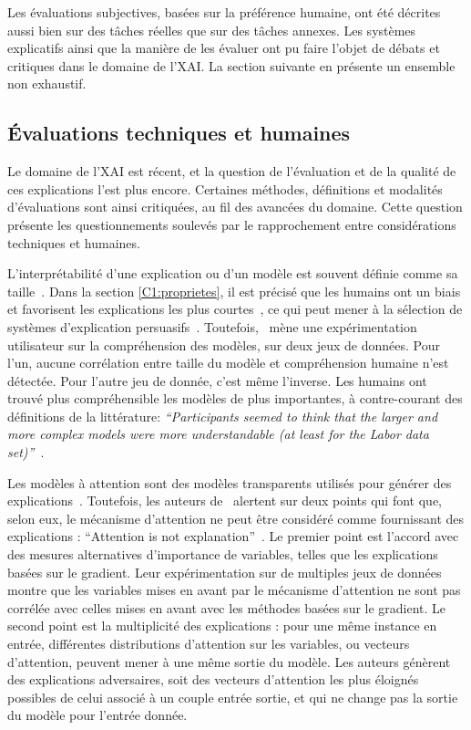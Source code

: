 Les évaluations subjectives, basées sur la préférence humaine, ont été décrites aussi bien sur des tâches réelles que sur des tâches annexes. Les systèmes explicatifs ainsi que la manière de les évaluer ont pu faire l'objet de débats et critiques dans le domaine de l'XAI. La section suivante en présente un ensemble non exhaustif.

\subsection{\'Evaluations techniques et humaines} \label{C1:debat}
Le domaine de l'XAI est récent, et la question de l'évaluation et de la qualité de ces explications l'est plus encore.
Certaines méthodes, définitions et modalités d'évaluations sont ainsi critiquées, au fil des avancées du domaine. Cette question présente les questionnements soulevés par le rapprochement entre considérations techniques et humaines.

L'interprétabilité d'une explication ou d'un modèle est souvent définie comme sa taille~\cite{Ribeiro2016,Petsiuk2018, Poppi2021,Lakkaraju2019,Zafar2021a,Virgolin2021}.
Dans la section \ref{C1:proprietes}, il est précisé que les humains ont un biais et favorisent les explications les plus courtes~\cite{Miller2017}, ce qui peut mener à la sélection de systèmes d'explication persuasifs~\cite{Gilpin2018}.
Toutefois,~\cite{Allahyari2011} mène une expérimentation utilisateur sur la compréhension des modèles, sur deux jeux de données. Pour l'un, aucune corrélation entre taille du modèle et compréhension humaine n'est détectée. Pour l'autre jeu de donnée, c'est même l'inverse. Les humains ont trouvé plus compréhensible les modèles de plus importantes, à contre-courant des définitions de la littérature: \textit{``Participants seemed to think that the larger and more complex models were more understandable (at least for the Labor data set)''}~\cite{Allahyari2011}.

Les modèles à attention sont des modèles transparents utilisés pour générer des explications~\cite{Lin2017,Wang2016,Yang2018,Bao2018,Gomez2022b,Ghaeini2018,SantanaCorreia2022}.
Toutefois, les auteurs de~\cite{Jain2019} alertent sur deux points qui font que, selon eux, le mécanisme d'attention ne peut être considéré comme fournissant des explications : ``Attention is not explanation''~\cite{Jain2019}.
Le premier point est l'accord avec des mesures alternatives d'importance de variables, telles que les explications basées sur le gradient. Leur expérimentation sur de multiples jeux de données montre que les variables mises en avant par le mécanisme d'attention ne sont pas corrélée avec celles mises en avant avec les méthodes basées sur le gradient.
Le second point est la multiplicité des explications : pour une même instance en entrée, différentes distributions d'attention sur les variables, ou vecteurs d'attention, peuvent mener à une même sortie du modèle. Les auteurs génèrent des explications adversaires, soit des vecteurs d'attention les plus éloignés possibles de celui associé à un couple entrée sortie, et qui ne change pas la sortie du modèle pour l'entrée donnée.

